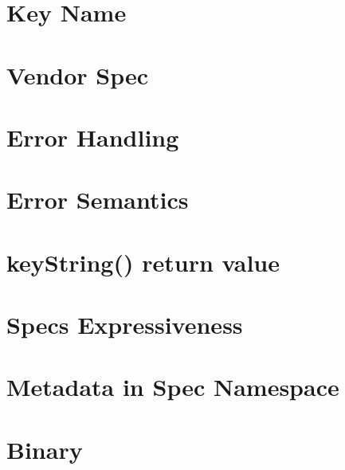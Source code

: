 \let\mypdfximage\pdfximage\def\pdfximage{\immediate\mypdfximage}\documentclass[twoside]{book}
\newcommand{\+}{\discretionary{\mbox{\scriptsize$\hookleftarrow$}}{}{}}
\begin{document}
\chapter{Key Name}
\label{doc_decisions_0b_rejected_separate_key_name_md}

\chapter{Vendor Spec}
\label{doc_decisions_0b_rejected_vendor_spec_md}

\chapter{Error Handling}
\label{doc_decisions_1_problem_clear_error_handling_md}

\chapter{Error Semantics}
\label{doc_decisions_1_problem_clear_error_semantics_md}

\chapter{key\+String() return value}
\label{doc_decisions_1_problem_clear_key_string_return_value_md}

\chapter{Spec\textquotesingle{}s Expressiveness}
\label{doc_decisions_1_problem_clear_spec_expressiveness_md}

\chapter{Metadata in Spec Namespace}
\label{doc_decisions_1_problem_clear_spec_metadata_md}

\chapter{Binary}
\label{doc_decisions_2_solutions_clear_binary_md}

\end{document}
